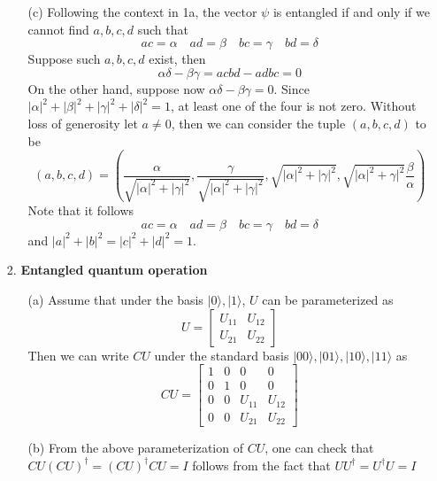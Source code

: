 \begin{enumerate}
\begin{enumerate}
    \item[(c)] Following the context in 1a, the vector $\psi$ is entangled if and only if we cannot find $a, b, c, d$ such that
    \[
    ac = \alpha \quad ad = \beta \quad bc = \gamma \quad bd = \delta
    \]
    Suppose such $a, b, c, d$ exist, then
    \[
    \alpha \delta - \beta \gamma = acbd - adbc = 0
    \]
    On the other hand, suppose now $\alpha \delta - \beta \gamma = 0$. Since $|\alpha|^2 + |\beta|^2 + |\gamma|^2 + |\delta|^2 = 1$, at least one of the four is not zero. Without loss of generosity let $a \neq 0$, then we can consider the tuple $(a, b, c, d)$ to be
    \[
    (a, b, c, d) = \left(\frac{\alpha}{\sqrt{|\alpha|^2 + |\gamma|^2}}, \frac{\gamma}{\sqrt{|\alpha|^2 + |\gamma|^2}}, \sqrt{|\alpha|^2 + |\gamma|^2}, \sqrt{|\alpha|^2 + \gamma|^2}\frac{\beta}{\alpha} \right)
    \]
    Note that it follows
    \[
    ac = \alpha \quad ad = \beta \quad bc = \gamma \quad bd = \delta
    \]
    and $|a|^2 + |b|^2 = |c|^2 + |d|^2 = 1$.
    
\end{enumerate}


\item[2.] \textbf{Entangled quantum operation}

\begin{enumerate}
    \item[(a)] Assume that under the basis $|0\rangle, |1\rangle$, $U$ can be parameterized as
    \[ U = 
    \begin{bmatrix}
    U_{11} & U_{12} \\ U_{21} & U_{22}
    \end{bmatrix}
    \]
    Then we can write $CU$ under the standard basis $|00\rangle, |01\rangle, |10 \rangle, |11\rangle$ as
    \[ CU = 
    \begin{bmatrix}
    1 & 0 & 0 & 0 \\
    0 & 1 & 0 & 0 \\
    0 & 0 & U_{11} & U_{12} \\
    0 & 0 & U_{21} & U_{22}
    \end{bmatrix}
    \]

    \item[(b)] From the above parameterization of $CU$, one can check that $CU (CU)^\dag = (CU)^\dag CU = I$ follows from the fact that $U U^\dag = U^\dag U = I$


\end{enumerate}
\end{enumerate}
